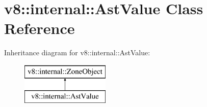 \hypertarget{classv8_1_1internal_1_1_ast_value}{}\section{v8\+:\+:internal\+:\+:Ast\+Value Class Reference}
\label{classv8_1_1internal_1_1_ast_value}
Inheritance diagram for v8\+:\+:internal\+:\+:Ast\+Value\+:\begin{figure}[H]
\begin{center}
\leavevmode
\includegraphics[height=2.000000cm]{classv8_1_1internal_1_1_ast_value}
\end{center}
\end{figure}

